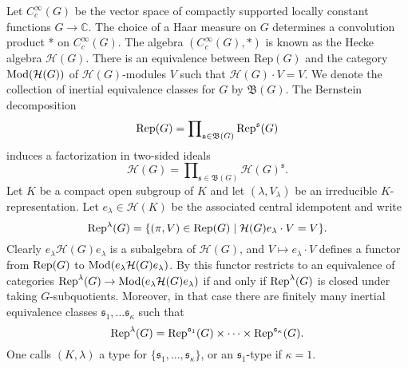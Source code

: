 \documentclass[11pt]{amsart}
\theoremstyle{definition}
\begin{document}
Let $C_c^\infty (G)$ be the vector space of compactly supported locally constant
functions $G \to {\mathbb C}$. The choice of a Haar measure on $G$ determines a convolution
product * on $C_c^\infty (G)$. The algebra $(C_c^\infty (G),*)$ is known as the \label{i:89}
Hecke algebra ${{\mathcal H}} (G)$. There is an equivalence between Rep$(G)$ and the category
${{\rm Mod}} ({{\mathcal H}} (G))$ of ${{\mathcal H}} (G)$-modules $V$ such that ${{\mathcal H}} (G) \cdot V = V$.
We denote the collection of inertial equivalence classes for $G$ by $\mathfrak B (G)$.
The Bernstein decomposition
\[
{{\rm Rep}} (G) = \prod\nolimits_{{{\mathfrak s}} \in \mathfrak B (G)} {{\rm Rep}}^{{\mathfrak s}} (G) 
\]
induces a factorization in two-sided ideals
\[
{{\mathcal H}} (G) = \prod\nolimits_{{{\mathfrak s}} \in \mathfrak B (G)} {{\mathcal H}} (G)^{{\mathfrak s}} .
\]
Let $K$ be a compact open subgroup of $K$ and let $(\lambda,V_\lambda)$ be an
irreducible $K$-representation.  Let $e_\lambda \in {{\mathcal H}} (K)$ 
be the associated central idempotent and write \label{i:44}
\[
{{\rm Rep}}^\lambda (G) = \{ (\pi,V) \in {{\rm Rep}} (G) \mid {{\mathcal H}} (G) e_\lambda \cdot V = V \} . 
\]
Clearly $e_\lambda {{\mathcal H}} (G) e_\lambda$ is a subalgebra of ${{\mathcal H}} (G)$, and
$V \mapsto e_\lambda \cdot V$ defines a functor from ${{\rm Rep}} (G)$ to 
${{\rm Mod}} (e_\lambda {{\mathcal H}} (G) e_\lambda)$. By \cite[Proposition 3.3]{BuKu3} this
functor restricts to an equivalence of categories ${{\rm Rep}}^\lambda (G) \to
{{\rm Mod}} (e_\lambda {{\mathcal H}} (G) e_\lambda)$ if and only if ${{\rm Rep}}^\lambda (G)$ is closed
under taking $G$-subquotients. Moreover, in that case there are finitely
many inertial equivalence classes ${{\mathfrak s}}_1, \ldots {{\mathfrak s}}_\kappa$ such that
\[
{{\rm Rep}}^\lambda (G) = {{\rm Rep}}^{{{\mathfrak s}}_1}(G) \times \cdots \times {{\rm Rep}}^{{{\mathfrak s}}_\kappa}(G) . 
\]
One calls $(K,\lambda)$ a type for $\{{{\mathfrak s}}_1,\ldots, {{\mathfrak s}}_\kappa\}$, or an ${{\mathfrak s}}_1$-type
if $\kappa = 1$. 
\end{document}
